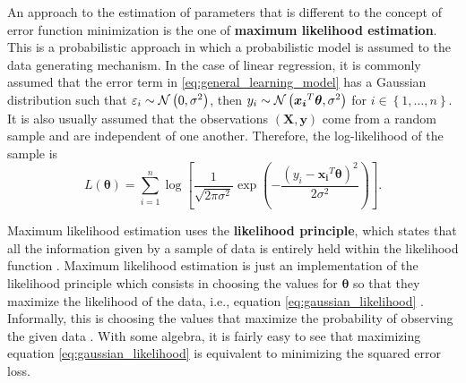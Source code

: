 An approach to the estimation of parameters that is different to the concept of error function minimization is the one of \textbf{maximum likelihood estimation}.
This is a probabilistic approach in which a probabilistic model is assumed to the data generating mechanism. In the case of linear regression, it is commonly assumed that the error term in \eqref{eq:general_learning_model} has a Gaussian distribution such that
$\varepsilon_i \sim \mathcal{N}\left( 0, \sigma^2 \right)$,
then $y_i \sim \mathcal{N}\left( \boldsymbol{x_i}^T \boldsymbol{\theta}, \sigma^2 \right)$ for $i \in \left\{ 1, \ldots, n \right\}$.
It is also usually assumed that the observations $(\boldsymbol{X}, \boldsymbol{y})$ come from a random sample and are independent of one another. Therefore, the log-likelihood of the sample is
\begin{equation}
  \label{eq:gaussian_likelihood}
  L(\boldsymbol{\theta}) = \sum_{i = 1}^n \log \left[ \frac{1}{\sqrt{2 \pi \sigma^2}} \exp \left({- \frac{(y_i - \boldsymbol{x_i}^T \boldsymbol{\theta})^2}{2\sigma^2}}\right) \right].
\end{equation}


Maximum likelihood estimation uses the \textbf{likelihood principle}, which states that all the information given by a sample of data is entirely held within the likelihood function \cite{gelman2013bayesian, robert2007bayesian}. Maximum likelihood estimation is just an implementation of the likelihood principle which consists in choosing the values for $\boldsymbol{\theta}$ so that they maximize the likelihood of the data, i.e., equation \eqref{eq:gaussian_likelihood} \cite{robert2007bayesian}. Informally, this is choosing the values that maximize the probability of observing the given data \cite[p.~31]{friedman2001elements} \cite{robert2007bayesian}. With some algebra, it is fairly easy to see that maximizing equation \eqref{eq:gaussian_likelihood} is equivalent to minimizing the squared error loss.


